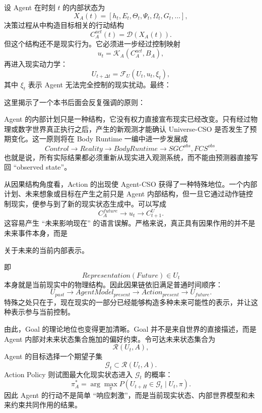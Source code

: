 设 Agent 在时刻 $t$ 的内部状态为
\[
X_A(t)
=
[h_t,E_t,\Theta_t,\Psi_t,\Omega_t,G_t,\ldots],
\]
决策过程从中构造目标相关的行动结构
\[
C_A^{act}(t)
=
\mathcal{D}
\left(
X_A(t)
\right).
\]
但这个结构还不是现实行为。它必须进一步经过控制映射
\[
u_t
=
\mathcal{K}_A
\left(
C_A^{act},
B_A
\right),
\]
再进入现实动力学：
\[
U_{t+\Delta t}
=
\mathcal{F}_U
\left(
U_t,
u_t,
\xi_t
\right),
\]
其中 $\xi_t$ 表示 Agent 无法完全控制的现实扰动。最终：
\begin{statementbox}
\centering
{}
\end{statementbox}

这里揭示了一个本书后面会反复强调的原则：
\begin{statementbox}
\centering
{}
\end{statementbox}
Agent 的内部计划只是一种结构，它没有权力直接宣布现实已经改变。只有经过物理或数字世界真正执行之后，产生的新观测才能确认 Universe-CSO 是否发生了预期变化。这一原则将在 Body Runtime 一编中进一步发展成
\[
Control
\rightarrow
Reality
\rightarrow
BodyRuntime
\rightarrow
SGC^{obs},FCS^{obs}.
\]
也就是说，所有实际结果都必须重新从现实进入观测系统，而不能由预测器直接写回 ``observed state''。

从因果结构角度看，Action 的出现使 Agent-CSO 获得了一种特殊地位。一个内部计划、未来想象或目标在产生之前只是 Agent 内部结构，但一旦它通过动作链控制现实，便参与到了新的现实状态生成中。可以写成
\[
C^{future}_A
\longrightarrow
u_t
\longrightarrow
C^U_{t+1}.
\]
这容易产生 ``未来影响现在'' 的语言误解。严格来说，真正具有因果作用的并不是未来事件本身，而是
\begin{statementbox}
关于未来的当前内部表示。
\end{statementbox}
即
\[
Representation(Future)
\in
U_t
\]
本身就是当前现实中的物理结构。因此因果链依旧满足普通时间顺序：
\[
U_{past}
\rightarrow
AgentModel_{present}
\rightarrow
Action_{present}
\rightarrow
U_{future}.
\]
特殊之处只在于，现在现实的一部分已经能够构造多种未来可能性的表示，并让这种表示参与当前控制。

由此，Goal 的理论地位也变得更加清晰。Goal 并不是来自世界的直接描述，而是 Agent 内部对未来状态集合施加的偏好约束。令可达未来状态集合为
\[
\mathcal{R}(U_t,A),
\]
Agent 的目标选择一个期望子集
\[
\mathcal{G}_t
\subset
\mathcal{R}(U_t,A).
\]
Action Policy 则试图最大化现实状态进入 $\mathcal G_t$ 的概率：
\[
\pi_A^*
=
\arg\max_{\pi}
P
\left(
U_{t+H}\in\mathcal G_t
\mid
U_t,\pi
\right).
\]
因此 Agent 的行动不是简单 ``响应刺激''，而是当前现实状态、内部世界模型和未来约束共同作用的结果。

